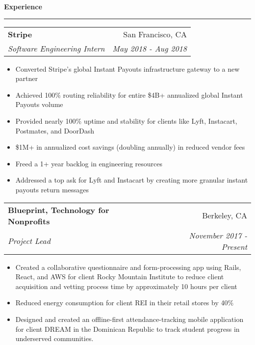 \documentclass[11pt,letterpaper]{article}
\makeatletter
\newenvironment{topic}[1]
    {
    {\Large \centerline{#1}}
    \vspace*{0.03in}
    \hrule 
    \vspace*{0.05in}
    }
    {}
\newenvironment{event}
    {
    \begin{tabular*}{\textwidth}{l@{\extracolsep{\fill}}r}
    }
    {
    \end{tabular*}
    }
\makeatother
\begin{document}
    \begin{topic}{\textbf{Experience}}
        \begin{event}
            \textbf{Stripe} & San Francisco, CA \\
            \emph{Software Engineering Intern} & \emph{May 2018 - Aug 2018} \\
        \end{event}
            \begin{itemize}
                \item Converted Stripe's global Instant Payouts infrastructure gateway to a new partner
                \setlength{\itemindent}{0.21in}
                \item Achieved 100\% routing reliability for entire \$4B+ annualized global Instant Payouts volume
                \item Provided nearly 100\% uptime and stability for clients like Lyft, Instacart, Postmates, and DoorDash
                \item \$1M+ in annualized cost savings (doubling annually) in reduced vendor fees
                \item Freed a 1+ year backlog in engineering resources
                \setlength{\itemindent}{0in}
                \item Addressed a top ask for Lyft and Instacart by creating more granular instant payouts return messages
            \end{itemize}

        \begin{event}
            \textbf{Blueprint, Technology for Nonprofits} & Berkeley, CA \\
            \emph{Project Lead} & \emph{November 2017 - Present}
        \end{event}
            \begin{itemize}
                \item Created a collaborative questionnaire and form-processing app using Rails, React, and AWS for client Rocky Mountain Institute to reduce client acquisition and vetting process time by approximately 10 hours per client
                \item Reduced energy consumption for client REI in their retail stores by 40\% 
                \item Designed and created an offline-first attendance-tracking mobile application for client DREAM in the Dominican Republic to track student progress in underserved communities.
            \end{itemize}


\end{topic}
\end{document}

